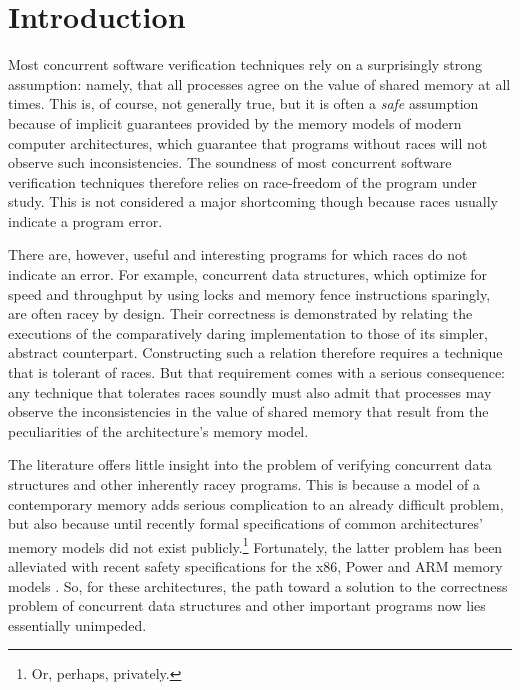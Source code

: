 \documentclass[11pt]{report}
\begin{document}

\chapter{Introduction}

Most concurrent software verification techniques rely on a
surprisingly strong assumption: namely, that all processes agree on
the value of shared memory at all times. This is, of course, not
generally true, but it is often a \emph{safe} assumption because of
implicit guarantees provided by the memory models of modern computer
architectures, which guarantee that programs without races will not
observe such inconsistencies. The soundness of most concurrent
software verification techniques therefore relies on race-freedom of
the program under study. This is not considered a major shortcoming
though because races usually indicate a program error.

There are, however, useful and interesting programs for which races do not indicate an error. For example, concurrent data structures, which optimize for speed and throughput by using locks and memory fence instructions sparingly, are often racey by design. Their correctness is demonstrated by relating the executions of the comparatively daring implementation to those of its simpler, abstract counterpart. Constructing such a relation therefore requires a technique that is tolerant of races. But that requirement comes with a serious consequence: any technique that tolerates races soundly must also admit that processes may observe the inconsistencies in the value of shared memory that result from the peculiarities of the architecture's memory model.

The literature offers little insight into the problem of verifying concurrent data structures and other inherently racey programs. This is because a model of a contemporary memory adds serious complication to an already difficult problem, but also because until recently formal specifications of common architectures' memory models did not exist publicly.\footnote{Or, perhaps, privately.} Fortunately, the latter problem has been alleviated with recent safety specifications for the x86, Power and ARM memory models \cite{DBLP:conf/tphol/OwensSS09,DBLP:conf/popl/2009damp}. So, for these architectures, the path toward a solution to the correctness problem of concurrent data structures and other important programs now lies essentially unimpeded.
\end{document}
